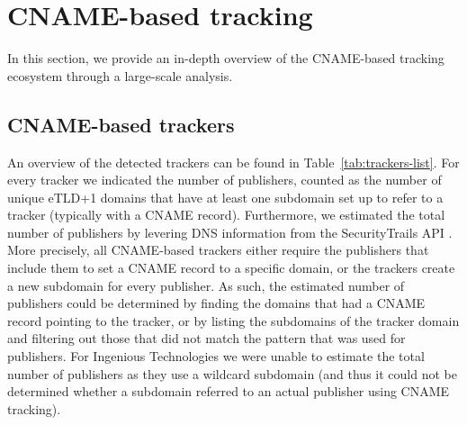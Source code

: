 \section{CNAME-based tracking}
\label{sec:cname-tracking}
In this section, we provide an in-depth overview of the CNAME-based tracking ecosystem through a large-scale analysis.

\subsection{CNAME-based trackers}
An overview of the detected trackers can be found in Table~\ref{tab:trackers-list}.
For every tracker we indicated the number of publishers, counted as the number of unique eTLD+1 domains that have at least one subdomain set up to refer to a tracker (typically with a CNAME record).
Furthermore, we estimated the total number of publishers by levering DNS information from the SecurityTrails API \cite{security_trails}.
More precisely, all CNAME-based trackers either require the publishers that include them to set a CNAME record to a specific domain, or the trackers create a new subdomain for every publisher.
As such, the estimated number of publishers could be determined by finding the domains that had a CNAME record pointing to the tracker, or by listing the subdomains of the tracker domain and filtering out those that did not match the pattern that was used for publishers.
For Ingenious Technologies we were unable to estimate the total number of publishers as they use a wildcard subdomain (and thus it could not be determined whether a subdomain referred to an actual publisher using CNAME tracking).


